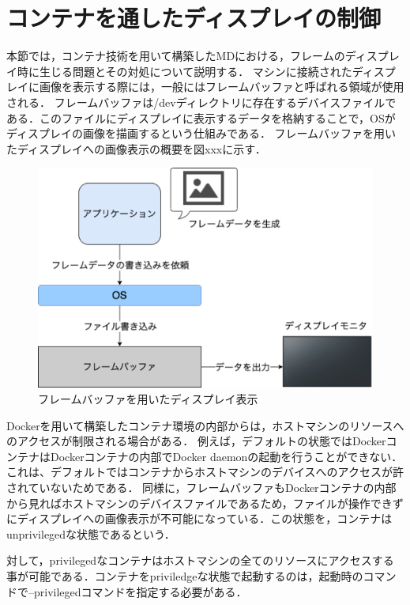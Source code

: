 \section{コンテナを通したディスプレイの制御}
本節では，コンテナ技術を用いて構築したMDにおける，フレームのディスプレイ時に生じる問題とその対処について説明する．
マシンに接続されたディスプレイに画像を表示する際には，一般にはフレームバッファと呼ばれる領域が使用される．
フレームバッファは/devディレクトリに存在するデバイスファイルである．このファイルにディスプレイに表示するデータを格納することで，OSがディスプレイの画像を描画するという仕組みである．
フレームバッファを用いたディスプレイへの画像表示の概要を図xxxに示す．

\begin{figure}[H]
    \hspace*{\fill}
    \includegraphics[width=\linewidth]{./fig/chap3/framebuffer.eps}
    \hspace*{\fill}
    \caption{フレームバッファを用いたディスプレイ表示}
\end{figure}

Dockerを用いて構築したコンテナ環境の内部からは，ホストマシンのリソースへのアクセスが制限される場合がある．
例えば，デフォルトの状態ではDockerコンテナはDockerコンテナの内部でDocker daemonの起動を行うことができない．
これは、デフォルトではコンテナからホストマシンのデバイスへのアクセスが許されていないためである．
同様に，フレームバッファもDockerコンテナの内部から見ればホストマシンのデバイスファイルであるため，ファイルが操作できずにディスプレイへの画像表示が不可能になっている．この状態を，コンテナはunprivilegedな状態であるという．

対して，privilegedなコンテナはホストマシンの全てのリソースにアクセスする事が可能である．コンテナをpriviledgeな状態で起動するのは，起動時のコマンドで--privilegedコマンドを指定する必要がある．


